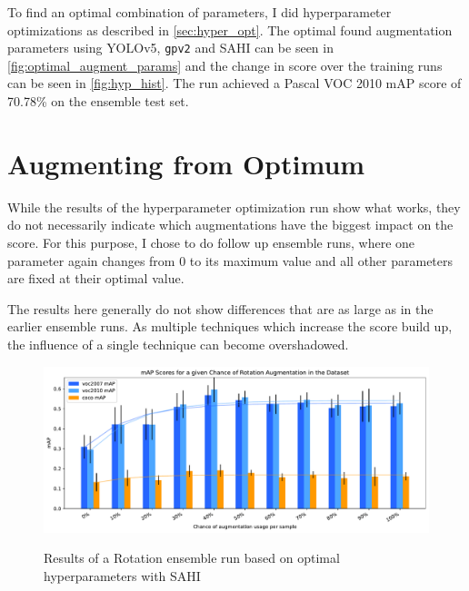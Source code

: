 \documentclass[10pt]{book}
\begin{document}

To find an optimal combination of parameters, I did hyperparameter optimizations as described in \autoref{sec:hyper_opt}. The optimal found augmentation parameters using \ac{YOLO}v5, \texttt{gpv2} and \ac{SAHI} can be seen in \autoref{fig:optimal_augment_params} and the change in score over the training runs can be seen in \autoref{fig:hyp_hist}. 
The run achieved a Pascal VOC 2010 \ac{mAP} score of 70.78\% on the ensemble test set.

\section{Augmenting from Optimum}

While the results of the hyperparameter optimization run show what works, they do not necessarily indicate which augmentations have the biggest impact on the score. For this purpose, I chose to do follow up ensemble runs, where one parameter again changes from 0 to its maximum value and all other parameters are fixed at their optimal value.

The results here generally do not show differences that are as large as in the earlier ensemble runs. As multiple techniques which increase the score build up, the influence of a single technique can become overshadowed.

\begin{figure}
  \caption{Results of a Rotation ensemble run based on optimal hyperparameters with \ac{SAHI}}
  \includegraphics[width=\textwidth]{image/hyp-based-rot-sahi-ensemble-2-thesis}
  \label{fig:hyp_based_rot_plot}
\end{figure}
\end{document}
